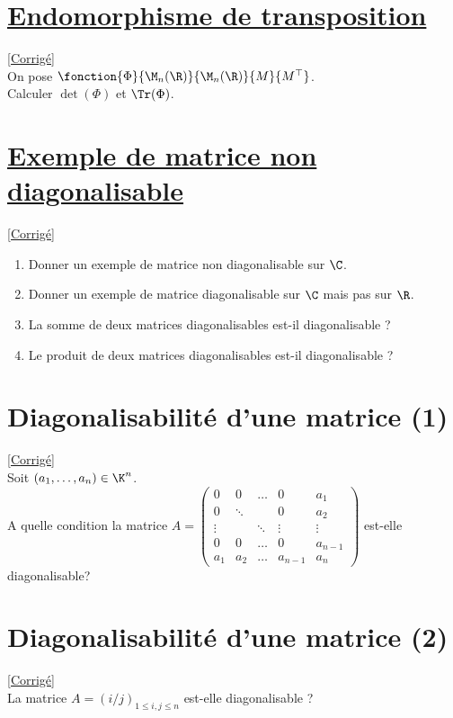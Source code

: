 \documentclass[8pt]{book}
\begin{document}
	\section{\underline{Endomorphisme de transposition} }
	\label{Endomorphisme de transposition}
	\textcolor{blue}{\hyperref[Endomorphisme de transposition corrigé]{[Corrigé]}}\\
	On pose $\fonction{\Phi}{\M_n(\R)}{\M_n(\R)}{M}{M^\top}$.\\
	Calculer $\det(\Phi)$ et $\Tr(\Phi)$.
	
	\section{\underline{Exemple de matrice non diagonalisable} }
	\label{Exemple de matrice non diagonalisable}
	\textcolor{blue}{\hyperref[Exemple de matrice non diagonalisable corrigé]{[Corrigé]}}\\
	\begin{enumerate}[leftmargin=*]
		\item Donner un exemple de matrice non diagonalisable sur $\C$.
		\item Donner un exemple de matrice diagonalisable sur $\C$ mais pas sur $\R$.
		\item La somme de deux matrices diagonalisables est-il diagonalisable ?
		\item Le produit de deux matrices diagonalisables est-il diagonalisable ?
	\end{enumerate}
	
	\section{Diagonalisabilité d'une matrice (1) }
	\label{Diagonalisabité d'une matrice (1)}
	\textcolor{blue}{\hyperref[Diagonalisabilité d'une matrice (1) corrigé]{[Corrigé]}}\\
	Soit $(a_1,\dots,a_n)\in \K^n$.\\
	A quelle condition la matrice
	$A=\begin{pmatrix}
		0&0&\dots&0&a_1\\
		0&\ddots&\ &0&a_2\\
		\vdots&\ &\ddots&\vdots&\vdots\\
		0&0&\dots&0&a_{n-1}\\
		a_1&a_2&\dots&a_{n-1}&a_n
	\end{pmatrix}$
	est-elle diagonalisable?
	
	\section{Diagonalisabilité d'une matrice (2) }
	\label{Diagonalisabité d'une matrice (2)}
	\textcolor{blue}{\hyperref[Diagonalisabilité d'une matrice (2) corrigé]{[Corrigé]}}\\
	La matrice $A=(i/j)_{1\leq i,j\leq n}$ est-elle diagonalisable ?
	
\end{document}
